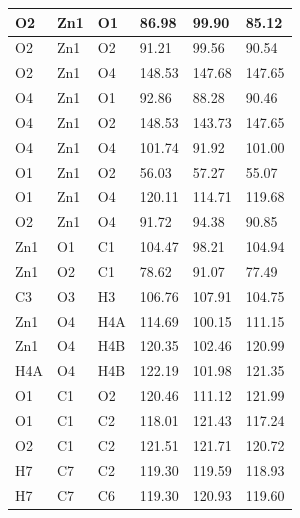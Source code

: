 \begin{longtable}{|l|l|l|lll|}
O2 & Zn1 & O1 & \multicolumn{1}{l|}{86.98} & \multicolumn{1}{l|}{99.90} & 85.12 \\ \hline
O2 & Zn1 & O2 & \multicolumn{1}{l|}{91.21} & \multicolumn{1}{l|}{99.56} & 90.54 \\ \hline
O2 & Zn1 & O4 & \multicolumn{1}{l|}{148.53} & \multicolumn{1}{l|}{147.68} & 147.65 \\ \hline
O4 & Zn1 & O1 & \multicolumn{1}{l|}{92.86} & \multicolumn{1}{l|}{88.28} & 90.46 \\ \hline
O4 & Zn1 & O2 & \multicolumn{1}{l|}{148.53} & \multicolumn{1}{l|}{143.73} & 147.65 \\ \hline
O4 & Zn1 & O4 & \multicolumn{1}{l|}{101.74} & \multicolumn{1}{l|}{91.92} & 101.00 \\ \hline
O1 & Zn1 & O2 & \multicolumn{1}{l|}{56.03} & \multicolumn{1}{l|}{57.27} & 55.07 \\ \hline
O1 & Zn1 & O4 & \multicolumn{1}{l|}{120.11} & \multicolumn{1}{l|}{114.71} & 119.68 \\ \hline
O2 & Zn1 & O4 & \multicolumn{1}{l|}{91.72} & \multicolumn{1}{l|}{94.38} & 90.85 \\ \hline
Zn1 & O1 & C1 & \multicolumn{1}{l|}{104.47} & \multicolumn{1}{l|}{98.21} & 104.94 \\ \hline
Zn1 & O2 & C1 & \multicolumn{1}{l|}{78.62} & \multicolumn{1}{l|}{91.07} & 77.49 \\ \hline
C3 & O3 & H3 & \multicolumn{1}{l|}{106.76} & \multicolumn{1}{l|}{107.91} & 104.75 \\ \hline
Zn1 & O4 & H4A & \multicolumn{1}{l|}{114.69} & \multicolumn{1}{l|}{100.15} & 111.15 \\ \hline
Zn1 & O4 & H4B & \multicolumn{1}{l|}{120.35} & \multicolumn{1}{l|}{102.46} & 120.99 \\ \hline
H4A & O4 & H4B & \multicolumn{1}{l|}{122.19} & \multicolumn{1}{l|}{101.98} & 121.35 \\ \hline
O1 & C1 & O2 & \multicolumn{1}{l|}{120.46} & \multicolumn{1}{l|}{111.12} & 121.99 \\ \hline
O1 & C1 & C2 & \multicolumn{1}{l|}{118.01} & \multicolumn{1}{l|}{121.43} & 117.24 \\ \hline
O2 & C1 & C2 & \multicolumn{1}{l|}{121.51} & \multicolumn{1}{l|}{121.71} & 120.72 \\ \hline
H7 & C7 & C2 & \multicolumn{1}{l|}{119.30} & \multicolumn{1}{l|}{119.59} & 118.93 \\ \hline
H7 & C7 & C6 & \multicolumn{1}{l|}{119.30} & \multicolumn{1}{l|}{120.93} & 119.60 \\ \hline

\end{longtable}
